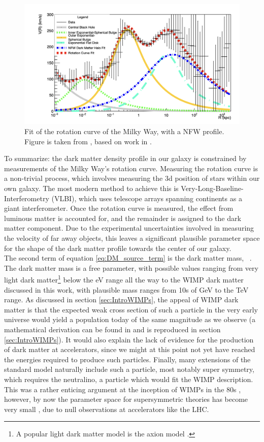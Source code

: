 \begin{figure}
    \centering
    \includegraphics{figures/Felix_rot_curve_fit.png}
    \caption{Fit of the rotation curve of the Milky Way, with a NFW profile. Figure is taken from \cite{Felix thesis}, based on work in \cite{}.}
    \label{fig:RotationCurveFit}
\end{figure}
To summarize: the dark matter density profile in our galaxy is constrained by measurements of the Milky Way's rotation curve. Measuring the rotation curve is a non-trivial process, which involves measuring the 3d position of stars within our own galaxy. The most modern method to achieve this is Very-Long-Baseline-Interferometry (VLBI), which uses telescope arrays spanning continents as a giant interferometer. Once the rotation curve is measured, the effect from luminous matter is accounted for, and the remainder is assigned to the dark matter component. Due to the experimental uncertainties involved in measuring the velocity of far away objects, this leaves a significant plausible parameter space for the shape of the dark matter profile towards the center of our galaxy. \\

The second term of equation \ref{eq:DM_source_term} is the dark matter mass, \dmm\ . The dark matter mass is a free parameter, with possible values ranging from very light dark matter\footnote{A popular light dark matter model is the axion model \cite{}.} below the eV range all the way to the WIMP dark matter discussed in this work, with plausible mass ranges from 10s of GeV to the TeV range. As discussed in section \ref{sec:IntroWIMPs}, the appeal of WIMP dark matter is that the expected weak cross section of such a particle in the very early universe would yield a population today of the same magnitude as we observe (a mathematical derivation can be found in \cite{dark matter production in the early universe} and is reproduced in section \ref{sec:IntroWIMPs}). It would also explain the lack of evidence for the production of dark matter at accelerators, since we might at this point not yet have reached the energies required to produce such particles. Finally, many extensions of the standard model naturally include such a particle, most notably super symmetry, which requires the neutralino, a particle which would fit the WIMP description\cite{}. This was a rather enticing argument at the inception of WIMPs in the 80s \cite{}, however, by now the parameter space for supersymmetric theories has become very small \cite{}, due to null observations at accelerators like the LHC.           

